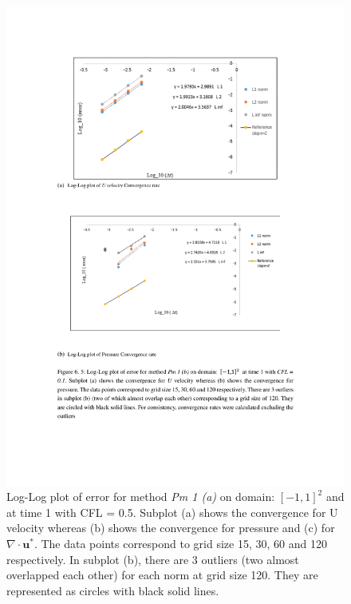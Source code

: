 \begin{figure}[H]
	\centering
	\includegraphics[scale=0.9]{figures/Pm1b_pf2_rate_t_1_cfl_0_5.pdf}
	\caption{Log-Log plot of error for method \textit{Pm 1 (a)} on domain: $[-1,1]^2$ and at time 1 with CFL = 0.5. Subplot (a) shows the convergence for U velocity whereas (b) shows the convergence for pressure and (c) for $\nabla \cdot \textbf{u}^*$. The data points correspond to grid size 15, 30, 60 and 120 respectively. In subplot (b), there are 3 outliers (two almost overlapped each other) for each norm at grid size 120. They are represented as circles with black solid lines.}\label{fig:6.5}
\end{figure}

